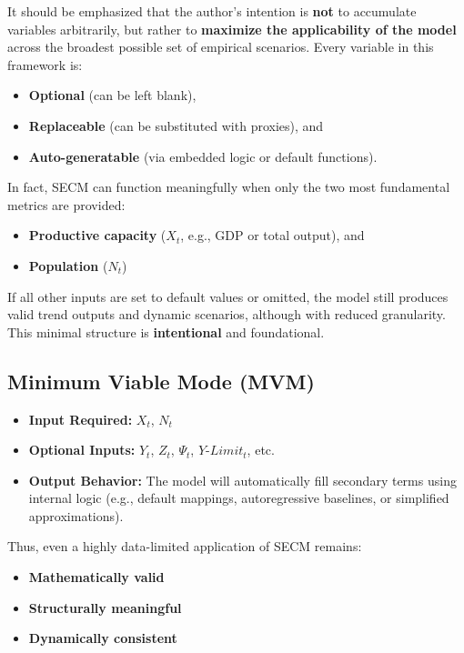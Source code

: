 \documentclass[12pt]{report}
\begin{document}
It should be emphasized that the author's intention is \textbf{ not} to accumulate variables arbitrarily, but rather to \textbf{ maximize the applicability of the model} across the broadest possible set of empirical scenarios. Every variable in this framework is:
\begin{itemize}
  \item \textbf{Optional} (can be left blank),
  \item \textbf{Replaceable} (can be substituted with proxies), and
  \item \textbf{Auto-generatable} (via embedded logic or default functions).
\end{itemize}

In fact, SECM can function meaningfully when only the two most fundamental metrics are provided:
\begin{itemize}
  \item \textbf{Productive capacity} ($X_t$, e.g., GDP or total output), and
  \item \textbf{Population} ($N_t$)
\end{itemize}

If all other inputs are set to default values or omitted, the model still produces valid trend outputs and dynamic scenarios, although with reduced granularity. This minimal structure is \textbf{intentional} and foundational.

\subsection*{Minimum Viable Mode (MVM)}

\begin{itemize}
  \item \textbf{Input Required:} $X_t$, $N_t$
  \item \textbf{Optional Inputs:} $Y_t$, $Z_t$, $\Psi_t$, $Y\text{-}Limit_t$, etc.
  \item \textbf{Output Behavior:} The model will automatically fill secondary terms using internal logic (e.g., default mappings, autoregressive baselines, or simplified approximations).
\end{itemize}

Thus, even a highly data-limited application of SECM remains:
\begin{itemize}
  \item \textbf{Mathematically valid}
  \item \textbf{Structurally meaningful}
  \item \textbf{Dynamically consistent}
\end{itemize}
\end{document}

